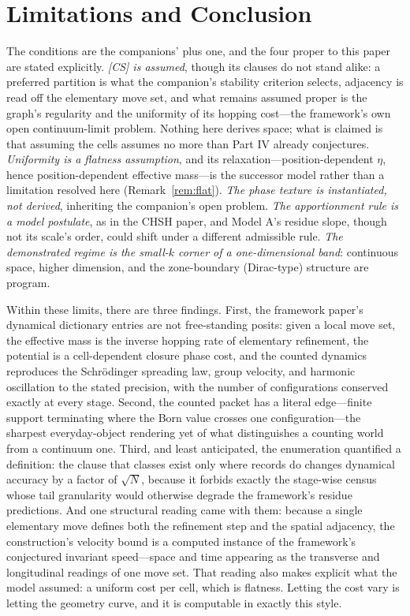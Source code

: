 \documentclass[11pt]{article}
\theoremstyle{definition}
\theoremstyle{remark}
\begin{document}
\section{Limitations and Conclusion}\label{sec:concl}
The conditions are the companions' plus one, and the four proper to this paper are stated explicitly. \emph{[CS] is assumed}, though its clauses do not stand alike: a preferred partition is what the companion's stability criterion selects, adjacency is read off the elementary move set, and what remains assumed proper is the graph's regularity and the uniformity of its hopping cost---the framework's own open continuum-limit problem. Nothing here derives space; what is claimed is that assuming the cells assumes no more than Part IV already conjectures. \emph{Uniformity is a flatness assumption}, and its relaxation---position-dependent $\eta$, hence position-dependent effective mass---is the successor model rather than a limitation resolved here (Remark~\ref{rem:flat}). \emph{The phase texture is instantiated, not derived}, inheriting the companion's open problem. \emph{The apportionment rule is a model postulate}, as in the CHSH paper, and Model A's residue slope, though not its scale's order, could shift under a different admissible rule. \emph{The demonstrated regime is the small-$k$ corner of a one-dimensional band}: continuous space, higher dimension, and the zone-boundary (Dirac-type) structure are program.

Within these limits, there are three findings. First, the framework paper's dynamical dictionary entries are not free-standing posits: given a local move set, the effective mass is the inverse hopping rate of elementary refinement, the potential is a cell-dependent closure phase cost, and the counted dynamics reproduces the Schr\"odinger spreading law, group velocity, and harmonic oscillation to the stated precision, with the number of configurations conserved exactly at every stage. Second, the counted packet has a literal edge---finite support terminating where the Born value crosses one configuration---the sharpest everyday-object rendering yet of what distinguishes a counting world from a continuum one. Third, and least anticipated, the enumeration quantified a definition: the clause that classes exist only where records do changes dynamical accuracy by a factor of $\sqrt{N}$, because it forbids exactly the stage-wise census whose tail granularity would otherwise degrade the framework's residue predictions. And one structural reading came with them: because a single elementary move defines both the refinement step and the spatial adjacency, the construction's velocity bound is a computed instance of the framework's conjectured invariant speed---space and time appearing as the transverse and longitudinal readings of one move set. That reading also makes explicit what the model assumed: a uniform cost per cell, which is flatness. Letting the cost vary is letting the geometry curve, and it is computable in exactly this style.
\end{document}
